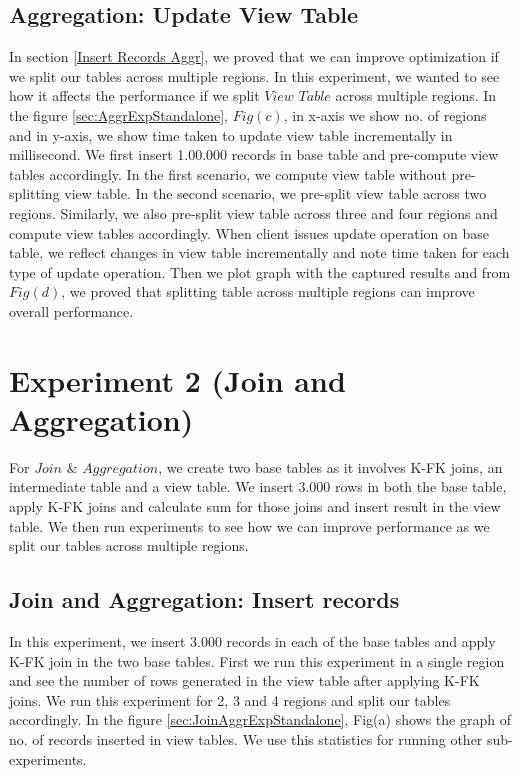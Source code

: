 \documentclass[11pt,a4paper,bibtotoc,idxtotoc,headsepline,footsepline,footexclude,BCOR12mm,DIV13]{scrbook}
\begin{document}
\subsection{Aggregation: Update View Table} 
\label{Update View Table Aggr}
In section \ref{Insert Records Aggr}, we proved that we can improve optimization if we split our tables across multiple regions. In this experiment, we wanted to see how it affects the performance if we split $View$ $Table$ across multiple regions. In the figure \ref{sec:AggrExpStandalone}, $Fig(c)$, in x-axis we show no. of regions and in y-axis, we show time taken to update view table incrementally in millisecond. We first insert 1.00.000 records in base table and pre-compute view tables accordingly. In the first scenario, we compute view table without pre-splitting view table. In the second scenario, we pre-split view table across two regions. Similarly, we also pre-split view table across three and four regions and compute view tables accordingly. When client issues update operation on base table, we reflect changes in view table incrementally and note time taken for each type of update operation. Then we plot graph with the captured results and from $Fig(d)$, we proved that splitting table across multiple regions can improve overall performance. 

\section{Experiment 2 (Join and Aggregation)}
\label{(sec:Join and Aggregation Exp)} 
For $Join$ \& $Aggregation$, we create two base tables as it involves K-FK joins, an intermediate table and a view table. We insert 3.000 rows in both the base table, apply K-FK joins and calculate sum for those joins and insert result in the view table. We then run experiments to see how we can improve performance as we split our tables across multiple regions.

\subsection{Join and Aggregation: Insert records}
\label{Join and Aggregation: Insert records Standalone}
In this experiment, we insert 3.000 records in each of the base tables and apply K-FK join in the two base tables. First we run this experiment in a single region and see the number of rows generated in the view table after applying K-FK joins. We run this experiment for 2, 3 and 4 regions and split our tables accordingly. In the figure \ref{sec:JoinAggrExpStandalone}, Fig(a) shows the graph of no. of records inserted in view tables. We use this statistics for running other sub-experiments.
\end{document}
